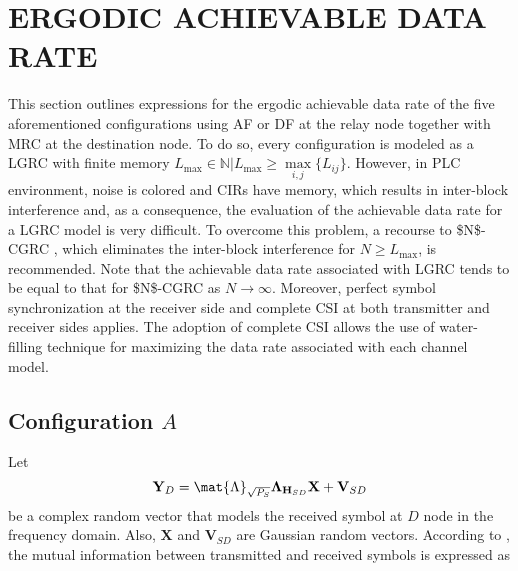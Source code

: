 \section{ERGODIC ACHIEVABLE DATA RATE} \label{sec:EADR_2S_SRC}

This section outlines expressions for the ergodic achievable data rate of the five aforementioned configurations using \ac{AF} or \ac{DF} at the relay node together with \ac{MRC} at the destination node. To do so, every configuration is modeled as a \ac{LGRC} \cite{Goldsmith2001} with finite memory $ L_{\text{max}} \in \mathbb{N}| L_{\text{max}} \geq \max\limits_{i,j} \{L_{ij}\}$. However, in \ac{PLC} environment, noise is colored and \ac{CIR}s have memory, which results in inter-block interference and, as a consequence, the evaluation of the achievable data rate for a \ac{LGRC} model is very difficult. To overcome this problem, a recourse to \ac{$N$-CGRC} \cite{Choudhuri2014}, which eliminates the inter-block interference for $ N \geq L_{\text{max}} $, is recommended. Note that the achievable data rate associated with \ac{LGRC} tends to be equal to that for \ac{$N$-CGRC} as $ N \rightarrow \infty $. Moreover, perfect symbol synchronization at the receiver side and complete \ac{CSI} at both transmitter and receiver sides applies. The adoption of complete \ac{CSI} allows the use of water-filling technique for maximizing the data rate associated with each channel model.

\subsection{\textbf{Configuration $A$}}\label{subsec:confa}

Let
\begin{equation}
	\mathbf{Y}_{D} = \mat{\Lambda}_{\sqrt{P_{S}}} \mathbf{\Lambda}_{\mathbf{H}_{SD}} \mathbf{X}+ \mathbf{V}_{SD}
\end{equation}
be a complex random vector that models the received symbol at $D$ node in the frequency domain. Also, $\mathbf{X}$ and $\mathbf{V}_{SD}$ are Gaussian random vectors. According to \cite{Cover2006}, the mutual information between transmitted and received symbols is expressed as

